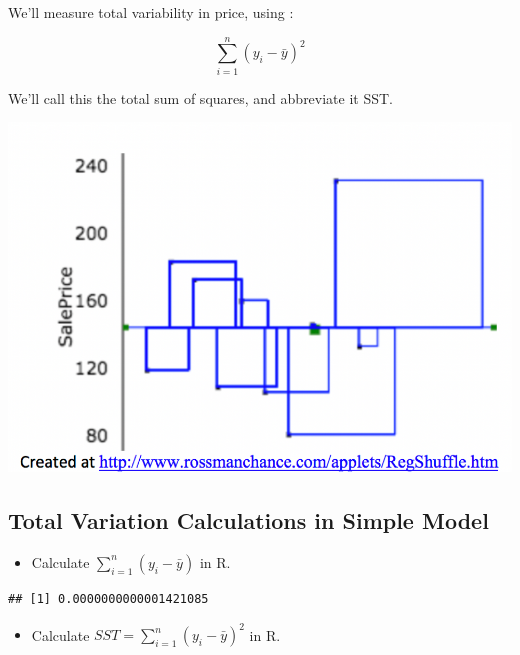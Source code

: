 \documentclass[]{book}
\newenvironment{Shaded}{\begin{snugshade}}{\end{snugshade}}
\newcommand{\KeywordTok}[1]{\textcolor[rgb]{0.13,0.29,0.53}{\textbf{#1}}}
\newcommand{\StringTok}[1]{\textcolor[rgb]{0.31,0.60,0.02}{#1}}
\newcommand{\OperatorTok}[1]{\textcolor[rgb]{0.81,0.36,0.00}{\textbf{#1}}}
\newcommand{\NormalTok}[1]{#1}
\providecommand{\tightlist}{%
  \setlength{\itemsep}{0pt}\setlength{\parskip}{0pt}}
\begin{document}
We'll measure total variability in price, using :

\[
\displaystyle\sum_{i=1}^n (y_i - \bar{y})^2
\]

We'll call this the total sum of squares, and abbreviate it SST.

\includegraphics[width=13.12in,height=0.65\textheight]{SST}

\subsection{Total Variation Calculations in Simple
Model}\label{total-variation-calculations-in-simple-model}

\begin{itemize}
\tightlist
\item
  Calculate \(\displaystyle\sum_{i=1}^n (y_i - \bar{y})\) in R.
\end{itemize}

\begin{Shaded}
\end{Shaded}

\begin{verbatim}
## [1] 0.0000000000001421085
\end{verbatim}

\begin{itemize}
\tightlist
\item
  Calculate \(SST = \displaystyle\sum_{i=1}^n (y_i - \bar{y})^2\) in R.
\end{itemize}
\end{document}
